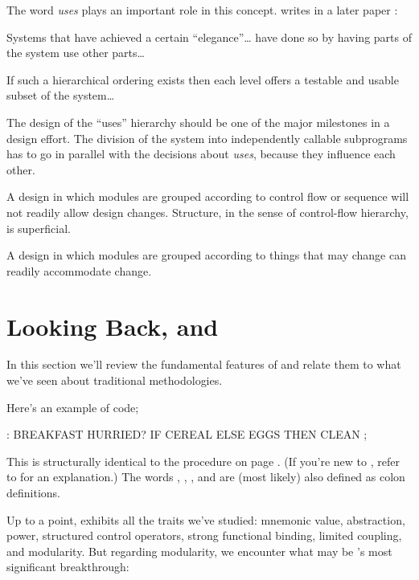 The word \emph{uses} plays an important role in this concept.
%
writes in a later paper \cite{parnas79}:

\begin{tfquot}
Systems that have achieved a certain ``elegance''\dots{} have done so
by having parts of the system use other parts\dots{}

If such a hierarchical ordering exists then each level offers a
testable and usable subset of the system\dots{}

The design of the ``uses'' hierarchy should be one of the major
milestones in a design effort. The division of the system into
independently callable subprograms has to go in parallel with the
decisions about \emph{uses}, because they influence each other.
\end{tfquot}
A design in which modules are grouped according to control flow or
sequence will not readily allow design changes. Structure, in the
sense of control-flow hierarchy, is superficial.

A design in which modules are grouped according to things that may
change can readily accommodate change.%
%


\section{Looking Back, and \Forth{}}%
In this section we'll review the fundamental features of \Forth{} and
relate them to what we've seen about traditional methodologies.

Here's an example of \Forth{} code;
\begin{Code}
: BREAKFAST
   HURRIED?  IF  CEREAL  ELSE  EGGS  THEN CLEAN ;
\end{Code}
This is structurally identical to the procedure  on
page \pageref{fig-fig1-4}. (If you're new to \Forth{}, refer to
 for an explanation.)  The words ,
, , and  are (most likely) also
defined as colon definitions.

Up to a point, \Forth{} exhibits all the traits we've studied: mnemonic
value, abstraction, power, structured control operators, strong
functional binding, limited coupling, and modularity. But regarding
modularity, we encounter what may be \Forth{}'s most significant
breakthrough:

